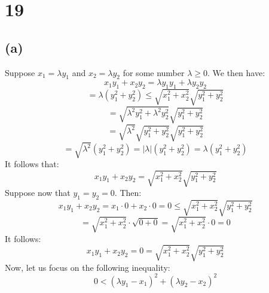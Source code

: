 \documentclass{article}
\begin{document}
\section*{19}
\subsection*{(a)}


Suppose \(x_{1} = \lambda y_{1}\) and \(x_{2} = \lambda y_{2}\) for some number \(\lambda \geq 0\).
We then have:
\begin{equation*}
	x_{1}y_{1} + x_{2}y_{2} = \lambda y_{1}y_{1} + \lambda y_{2}y_{2}
\end{equation*}
\begin{equation*}
	= \lambda (y_{1}^{2} + y_{2}^{2}) \leq \sqrt{x_{1}^{2} + x_{2}^{2}}\sqrt{y_{1}^{2} + y_{2}^{2}}
\end{equation*}
\begin{equation*}
	= \sqrt{\lambda^{2} y_{1}^{2} + \lambda^{2} y_{2}^{2}}\sqrt{y_{1}^{2} + y_{2}^{2}}
\end{equation*}
\begin{equation*}
	= \sqrt{\lambda^{2}}\sqrt{y_{1}^{2} + y_{2}^{2}}\sqrt{y_{1}^{2} + y_{2}^{2}}
\end{equation*}
\begin{equation*}
	= \sqrt{\lambda^{2}} (y_{1}^{2} + y_{2}^{2}) = |\lambda|(y_{1}^{2} + y_{2}^{2}) = \lambda (y_{1}^{2} + y_{2}^{2})
\end{equation*}
It follows that:
\begin{equation*}
	x_{1}y_{1} + x_{2}y_{2} = \sqrt{x_{1}^{2} + x_{2}^{2}}\sqrt{y_{1}^{2} + y_{2}^{2}}
\end{equation*}
Suppose now that \(y_{1} = y_{2} = 0\). Then:
\begin{equation*}
	x_{1}y_{1} + x_{2}y_{2} = x_{1} \cdot 0 + x_{2} \cdot 0 = 0 \leq \sqrt{x_{1}^{2} + x_{2}^{2}}\sqrt{y_{1}^{2} + y_{2}^{2}}
\end{equation*}
\begin{equation*}
	= \sqrt{x_{1}^{2} + x_{2}^{2}} \cdot \sqrt{0 + 0} = \sqrt{x_{1}^{2} + x_{2}^{2}} \cdot 0 = 0
\end{equation*}
It follows:
\begin{equation*}
	x_{1}y_{1} + x_{2}y_{2} = 0 = \sqrt{x_{1}^{2} + x_{2}^{2}}\sqrt{y_{1}^{2} + y_{2}^{2}}
\end{equation*}
Now, let us focus on the following inequality:
\begin{equation*}
	0 < (\lambda y_{1} - x_{1})^{2} + (\lambda y_{2} - x_{2})^{2}
\end{equation*}
\end{document}
